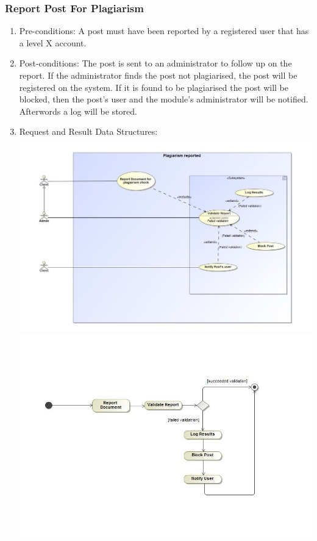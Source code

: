 \documentclass[hidelinks, 12pt, oneside]{article}
\begin{document}
\subsubsection{Report Post For Plagiarism}
\begin{enumerate}
 \item Pre-conditions: A post must have been reported by a registered user that has a level X account. 
 \\
 
 \item Post-conditions: The post is sent to an administrator to follow up on the report. If the administrator finds the post not plagiarised, the post will be registered on the system. If it is found to be plagiarised the post will be blocked, then the post's user and the module's administrator will be notified. Afterwords a log will be stored. 
   \\
 \item Request and Result Data Structures:\\
  \includegraphics[scale=0.4]{plagiarismReportUC}\\
 \includegraphics[scale=0.35]{plagiarismReportAD} 
\end{enumerate}
\end{document}
